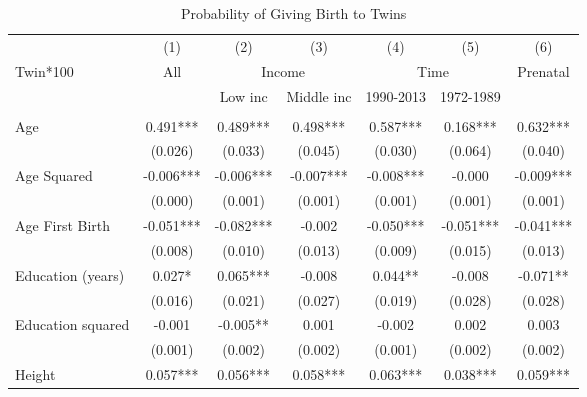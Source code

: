 \begin{landscape}\begin{table}[htpb!] 
\caption{Probability of Giving Birth to Twins} \label{TWINtab:twinreg1} 
\begin{center}\begin{tabular}{lcccccc} \toprule \toprule 
&(1)&(2)&(3)&(4)&(5)&(6)\\
Twin*100&All&\multicolumn{2}{c}{Income}&\multicolumn{2}{c}{Time}&Prenatal\\
 \cmidrule(r){3-4} \cmidrule(r){5-6} 
&&Low inc&Middle inc&1990-2013&1972-1989&\\\midrule
\begin{footnotesize}\end{footnotesize}&\begin{footnotesize}\end{footnotesize}&\begin{footnotesize}\end{footnotesize}&\begin{footnotesize}\end{footnotesize}&\begin{footnotesize}\end{footnotesize}&\begin{footnotesize}\end{footnotesize}&\begin{footnotesize}\end{footnotesize}\\
Age&0.491***&0.489***&0.498***&0.587***&0.168***&0.632***\\
&(0.026)&(0.033)&(0.045)&(0.030)&(0.064)&(0.040)\\
Age Squared&-0.006***&-0.006***&-0.007***&-0.008***&-0.000&-0.009***\\
&(0.000)&(0.001)&(0.001)&(0.001)&(0.001)&(0.001)\\
Age First Birth&-0.051***&-0.082***&-0.002&-0.050***&-0.051***&-0.041***\\
&(0.008)&(0.010)&(0.013)&(0.009)&(0.015)&(0.013)\\
Education (years)&0.027*&0.065***&-0.008&0.044**&-0.008&-0.071**\\
&(0.016)&(0.021)&(0.027)&(0.019)&(0.028)&(0.028)\\
Education squared&-0.001&-0.005**&0.001&-0.002&0.002&0.003\\
&(0.001)&(0.002)&(0.002)&(0.001)&(0.002)&(0.002)\\
Height&0.057***&0.056***&0.058***&0.063***&0.038***&0.059***\\

\end{tabular}
\end{center}
\end{table}
\end{landscape}
